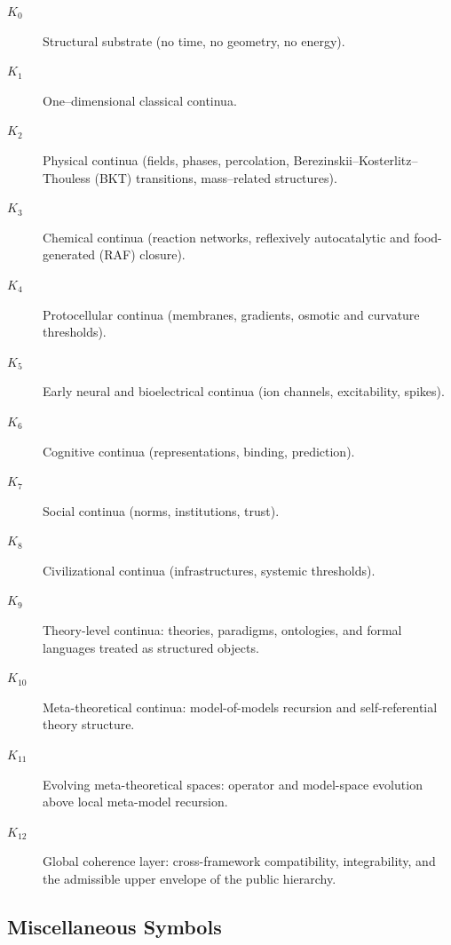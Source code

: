 \begin{description}
  \item[\(K_0\)] Structural substrate (no time, no geometry, no energy).
  \item[\(K_1\)] One--dimensional classical continua.
  \item[\(K_2\)] Physical continua (fields, phases, percolation,
        Berezinskii--Kosterlitz--Thouless (BKT) transitions,
        mass--related structures).
  \item[\(K_3\)] Chemical continua (reaction networks,
        reflexively autocatalytic and food-generated (RAF) closure).
  \item[\(K_4\)] Protocellular continua (membranes, gradients, osmotic and
        curvature thresholds).
  \item[\(K_5\)] Early neural and bioelectrical continua (ion channels,
        excitability, spikes).
  \item[\(K_6\)] Cognitive continua (representations, binding, prediction).
  \item[\(K_7\)] Social continua (norms, institutions, trust).
  \item[\(K_8\)] Civilizational continua (infrastructures, systemic
        thresholds).
  \item[\(K_9\)] Theory-level continua: theories, paradigms, ontologies, and
        formal languages treated as structured objects.
  \item[\(K_{10}\)] Meta-theoretical continua: model-of-models recursion and
        self-referential theory structure.
  \item[\(K_{11}\)] Evolving meta-theoretical spaces: operator and model-space
        evolution above local meta-model recursion.
  \item[\(K_{12}\)] Global coherence layer: cross-framework compatibility,
        integrability, and the admissible upper envelope of the public
        hierarchy.
\end{description}

\subsection{Miscellaneous Symbols}

